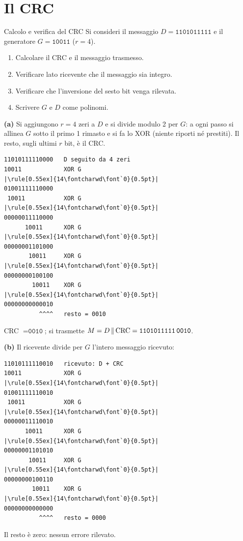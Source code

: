 \section{Il CRC}

\begin{esercizio}{Calcolo e verifica del CRC}
Si consideri il messaggio $D = \texttt{1101011111}$ e il generatore $G = \texttt{10011}$ ($r = 4$).
\begin{enumerate}[label=(\alph*)]
    \item Calcolare il CRC e il messaggio trasmesso.
    \item Verificare lato ricevente che il messaggio sia integro.
    \item Verificare che l'inversione del sesto bit venga rilevata.
    \item Scrivere $G$ e $D$ come polinomi.
\end{enumerate}
\end{esercizio}

\svolgimento
\textbf{(a)} Si aggiungono $r = 4$ zeri a $D$ e si divide modulo 2 per $G$: a ogni passo si allinea $G$ sotto il primo 1 rimasto e si fa lo
XOR (niente riporti né prestiti). Il resto, sugli ultimi $r$ bit, è il CRC.
\begin{lstlisting}[autogobble=false, escapechar=|]
11010111110000   D seguito da 4 zeri
10011            XOR G
|\rule[0.55ex]{14\fontcharwd\font`0}{0.5pt}|
01001111110000
 10011           XOR G
|\rule[0.55ex]{14\fontcharwd\font`0}{0.5pt}|
00000011110000
      10011      XOR G
|\rule[0.55ex]{14\fontcharwd\font`0}{0.5pt}|
00000001101000
       10011     XOR G
|\rule[0.55ex]{14\fontcharwd\font`0}{0.5pt}|
00000000100100
        10011    XOR G
|\rule[0.55ex]{14\fontcharwd\font`0}{0.5pt}|
00000000000010
          ^^^^   resto = 0010
\end{lstlisting}
CRC $= \texttt{0010}$; si trasmette $M = D\,\|\,\text{CRC} = \texttt{1101011111\,0010}$.

\textbf{(b)} Il ricevente divide per $G$ l'intero messaggio ricevuto:
\begin{lstlisting}[autogobble=false, escapechar=|]
11010111110010   ricevuto: D + CRC
10011            XOR G
|\rule[0.55ex]{14\fontcharwd\font`0}{0.5pt}|
01001111110010
 10011           XOR G
|\rule[0.55ex]{14\fontcharwd\font`0}{0.5pt}|
00000011110010
      10011      XOR G
|\rule[0.55ex]{14\fontcharwd\font`0}{0.5pt}|
00000001101010
       10011     XOR G
|\rule[0.55ex]{14\fontcharwd\font`0}{0.5pt}|
00000000100110
        10011    XOR G
|\rule[0.55ex]{14\fontcharwd\font`0}{0.5pt}|
00000000000000
          ^^^^   resto = 0000
\end{lstlisting}
Il resto è zero: nessun errore rilevato.

